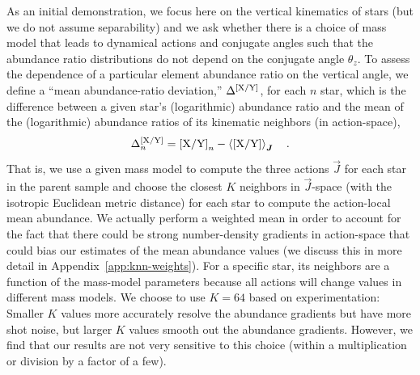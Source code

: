 \documentclass[modern]{aastex63}
\begin{document}
As an initial demonstration, we focus here on the vertical kinematics of stars
(but we do not assume separability) and we ask whether there is a choice of mass
model that leads to dynamical actions and conjugate angles such that the
abundance ratio distributions do not depend on the conjugate angle $\theta_z$.
To assess the dependence of a particular element abundance ratio
 on the vertical angle, we define a ``mean abundance-ratio
deviation,'' $\Delta^{{[\mathrm{X}/\mathrm{Y}]}}$, for each $n$ star, which is the
difference between a given star's (logarithmic) abundance ratio and the mean of
the (logarithmic) abundance ratios of its kinematic neighbors (in action-space),
\begin{equation}
  \Delta^{\abunratio{X}{Y}}_n = \abunratio{X}{Y}_n -
    \mean{\abunratio{X}{Y}}_{\vec{J}}
    \quad . \label{eq:mean-abun-dev}
\end{equation}
That is, we use a given mass model to compute the three actions $\vec{J}$ for
each star in the parent sample and choose the closest $K$ neighbors in
$\vec{J}$-space (with the isotropic Euclidean metric distance) for each star to
compute the action-local mean abundance.
We actually perform a weighted mean in order to account for the fact that there
could be strong number-density gradients in action-space that could bias our
estimates of the mean abundance values (we discuss this in more detail in
Appendix~\ref{app:knn-weights}).
For a specific star, its neighbors are a function of the mass-model parameters
because all actions will change values in different mass models.
We choose to use $K=64$ based on experimentation: Smaller $K$ values more
accurately resolve the abundance gradients but have more shot noise, but larger
$K$ values smooth out the abundance gradients.
However, we find that our results are not very sensitive to this choice (within
a multiplication or division by a factor of a few).
\end{document}
